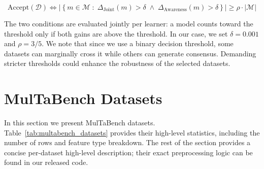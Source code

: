 \documentclass{llmxive}
\begin{document}
$$ \text{Accept}(\mathcal{D}) \iff \left|\left\{ m \in \mathcal{M} \;:\; \Delta_{\text{Joint}}(m) > \delta \;\land\; \Delta_{\text{Awareness}}(m) > \delta \right\}\right| \geq \rho \cdot |\mathcal{M}| $$

The two conditions are evaluated jointly per learner: a model counts toward the threshold only if both gains are above the threshold. In our case, we set $\delta=0.001$ and $\rho=3/5$. We note that since we use a binary decision threshold, some datasets can marginally cross it while others can generate consensus. Demanding stricter thresholds could enhance the robustness of the selected datasets.


\section{MulTaBench Datasets}
\label{app:multabench}

In this section we present MulTaBench datasets. Table~\ref{tab:multabench_datasets} provides their high-level statistics, including the number of rows and feature type breakdown. The rest of the section provides a concise per-dataset high-level description; their exact preprocessing logic can be found in our released code.
\end{document}
